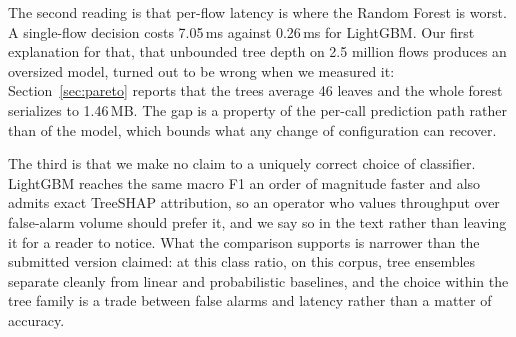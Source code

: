 \documentclass{ieeeaccess}
\begin{document}
The second reading is that per-flow latency is where the Random Forest is worst.
A single-flow decision costs 7.05\,ms against 0.26\,ms for LightGBM. Our first
explanation for that, that unbounded tree depth on 2.5 million flows produces an
oversized model, turned out to be wrong when we measured it:
Section~\ref{sec:pareto} reports that the trees average 46 leaves and the whole
forest serializes to 1.46\,MB. The gap is a property of the per-call prediction
path rather than of the model, which bounds what any change of configuration can
recover.

The third is that we make no claim to a uniquely correct choice of classifier.
LightGBM reaches the same macro F1 an order of magnitude faster and also admits
exact TreeSHAP attribution, so an operator who values throughput over false-alarm
volume should prefer it, and we say so in the text rather than leaving it for a
reader to notice. What the comparison supports is narrower than the submitted
version claimed: at this class ratio, on this corpus, tree ensembles separate
cleanly from linear and probabilistic baselines, and the choice within the tree
family is a trade between false alarms and latency rather than a matter of
accuracy.
\end{document}
